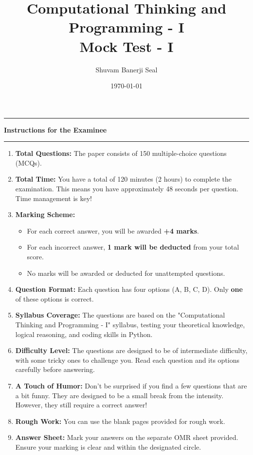 \documentclass[9pt]{article}
\author{Shuvam Banerji Seal}
\title{Computational Thinking and Programming - I \\ Mock Test - I}
\date{\today}
\begin{document}
\maketitle

\begin{center}
\hrule
\vspace{1em}
\textbf{Instructions for the Examinee}
\vspace{1em}
\hrule
\end{center}

\begin{enumerate}
\item \textbf{Total Questions:} The paper consists of 150 multiple-choice questions (MCQs).
\item \textbf{Total Time:} You have a total of 120 minutes (2 hours) to complete the examination. This means you have approximately 48 seconds per question. Time management is key!
\item \textbf{Marking Scheme:}
\begin{itemize}
\item For each correct answer, you will be awarded \textbf{+4 marks}.
\item For each incorrect answer, \textbf{1 mark will be deducted} from your total score.
\item No marks will be awarded or deducted for unattempted questions.
\end{itemize}
\item \textbf{Question Format:} Each question has four options (A, B, C, D). Only \textbf{one} of these options is correct.
\item \textbf{Syllabus Coverage:} The questions are based on the "Computational Thinking and Programming - I" syllabus, testing your theoretical knowledge, logical reasoning, and coding skills in Python.
\item \textbf{Difficulty Level:} The questions are designed to be of intermediate difficulty, with some tricky ones to challenge you. Read each question and its options carefully before answering.
\item \textbf{A Touch of Humor:} Don't be surprised if you find a few questions that are a bit funny. They are designed to be a small break from the intensity. However, they still require a correct answer!
\item \textbf{Rough Work:} You can use the blank pages provided for rough work.
\item \textbf{Answer Sheet:} Mark your answers on the separate OMR sheet provided. Ensure your marking is clear and within the designated circle.
\end{enumerate}
\end{document}
